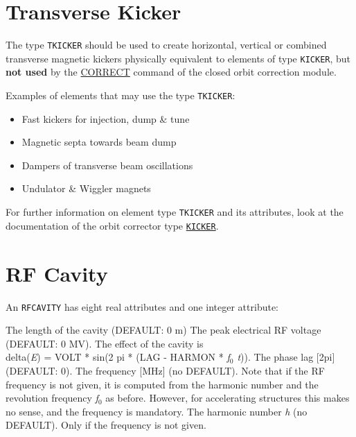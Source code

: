 \section{Transverse Kicker}
\label{sec:tkicker}

The type {\tt TKICKER} should be used to create horizontal, vertical or
combined transverse magnetic kickers physically equivalent to elements of type
{\tt KICKER}, but \textbf{not used} by the \hyperref[sec:correct]{CORRECT} 
command of the closed orbit correction module.

Examples of elements that may use the type {\tt TKICKER}: 
\begin{itemize}
   \item Fast kickers for injection, dump \& tune
   \item Magnetic septa towards beam dump
   \item Dampers of transverse beam oscillations
   \item Undulator \& Wiggler magnets
\end{itemize}

For further information on element type {\tt TKICKER} and its attributes, look
at the documentation of the orbit corrector type
\hyperref[sec:kicker]{\tt KICKER}.   


\section{RF Cavity}
\label{sec:rf_cavity}\label{sec:rfcavity}




An {\tt RFCAVITY} has eight real attributes and one integer attribute: 
\begin{madlist}
    The length of the cavity (DEFAULT: 0 m) 
    The peak electrical RF voltage (DEFAULT: 0 MV). The effect of 
   the cavity is \\
     delta(\textit{E}) = VOLT * sin(2 pi * (LAG - HARMON * \textit{f$_0$ t})). 
    The phase lag [2pi] (DEFAULT: 0). 
    The frequency [MHz] (no DEFAULT). Note that if the RF
     frequency is not given, it is computed from the harmonic number and
     the revolution frequency \textit{f$_0$} as before. However, for
     accelerating structures this makes no sense, and the frequency is
     mandatory.  
    The harmonic number \textit{h} (no DEFAULT). Only if
     the frequency is not given.  
\end{madlist}

